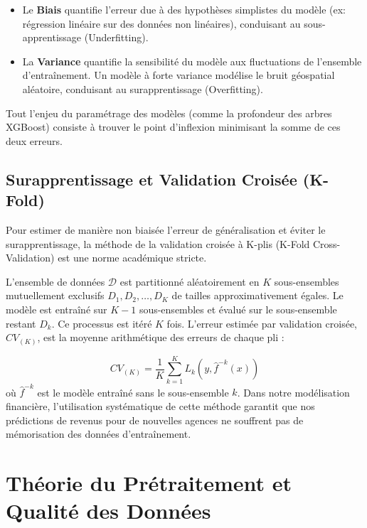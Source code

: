 \documentclass[11pt,a4paper,twoside]{report}
\begin{document}
\begin{itemize}
    \item Le \textbf{Biais} quantifie l'erreur due à des hypothèses simplistes du modèle (ex: régression linéaire sur des données non linéaires), conduisant au sous-apprentissage (Underfitting).
    \item La \textbf{Variance} quantifie la sensibilité du modèle aux fluctuations de l'ensemble d'entraînement. Un modèle à forte variance modélise le bruit géospatial aléatoire, conduisant au surapprentissage (Overfitting).
\end{itemize}

Tout l'enjeu du paramétrage des modèles (comme la profondeur des arbres XGBoost) consiste à trouver le point d'inflexion minimisant la somme de ces deux erreurs.

\subsection{Surapprentissage et Validation Croisée (K-Fold)}

Pour estimer de manière non biaisée l'erreur de généralisation et éviter le surapprentissage, la méthode de la validation croisée à K-plis (K-Fold Cross-Validation) est une norme académique stricte. 

L'ensemble de données $\mathcal{D}$ est partitionné aléatoirement en $K$ sous-ensembles mutuellement exclusifs $D_1, D_2, \dots, D_K$ de tailles approximativement égales. Le modèle est entraîné sur $K-1$ sous-ensembles et évalué sur le sous-ensemble restant $D_k$. Ce processus est itéré $K$ fois. L'erreur estimée par validation croisée, $CV_{(K)}$, est la moyenne arithmétique des erreurs de chaque pli :

\begin{equation}
CV_{(K)} = \frac{1}{K} \sum_{k=1}^{K} L_k(y, \hat{f}^{-k}(x))
\end{equation}
où $\hat{f}^{-k}$ est le modèle entraîné sans le sous-ensemble $k$. Dans notre modélisation financière, l'utilisation systématique de cette méthode garantit que nos prédictions de revenus pour de nouvelles agences ne souffrent pas de mémorisation des données d'entraînement.

\section{Théorie du Prétraitement et Qualité des Données}
\end{document}
